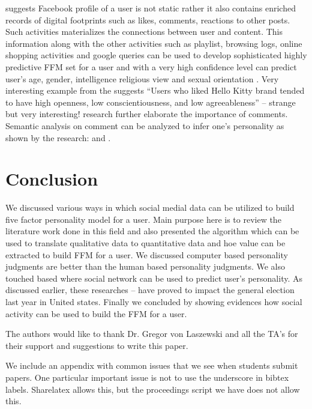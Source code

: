 \documentclass[sigconf]{acmart}
\begin{document}
\cite{ref13} suggests Facebook profile of a user is not static rather it also contains enriched records of digital footprints such as likes, comments, reactions to other posts. Such activities materializes the connections between user and content. This information along with the other activities such as playlist, browsing logs, online shopping activities and google queries can be used to develop sophisticated highly predictive FFM set for a user and with a very high confidence level can predict user’s age, gender, intelligence religious view and sexual orientation \cite{ref13}. Very interesting example from the \cite{ref13} suggests “Users who liked Hello Kitty brand tended to have high openness, low conscientiousness, and low agreeableness” – strange but very interesting! \cite{ref13} research further elaborate the importance of comments. Semantic analysis on comment can be analyzed to infer one’s personality as shown by the research: \cite{ref16} and \cite{ref17}. 
 
\section{Conclusion}

We discussed various ways in which social medial data can be utilized to build five factor personality model for a user. Main purpose here is to review the literature work done in this field and also presented the algorithm which can be used to translate qualitative data to quantitative data and hoe value can be extracted to build FFM for a user. We discussed computer based personality judgments are better than the human based personality judgments. We also touched based where social network can be used to predict user’s personality.  As discussed earlier, these researches \cite{ref2} – \cite{ref7}  have proved to impact the general election last year in United states. Finally we concluded by showing evidences how social activity can be used to build the FFM for a user. 


\begin{acks}

  The authors would like to thank Dr. Gregor von Laszewski and all the TA's for their
  support and suggestions to write this paper. 

\end{acks}


 

\appendix

We include an appendix with common issues that we see when students
submit papers. One particular important issue is not to use the
underscore in bibtex labels. Sharelatex allows this, but the
proceedings script we have does not allow this.
\end{document}
